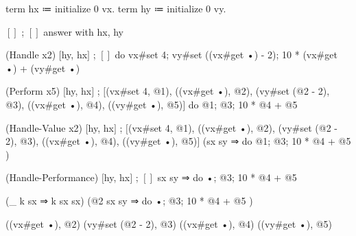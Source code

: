 \begin{snippet}
term hx ≔ initialize 0 vx.
term hy ≔ initialize 0 vy.

$[]$ ; $[]$
answer with hx, hy

(Handle x2)
$[$hy, hx$]$ ; $[]$
do{ vx#set 4; vy#set ((vx#get •) - 2); 10 * (vx#get •) + (vy#get •) }

(Perform x5)
$[$hy, hx$]$ ; $[$(vx#set 4, @1), ((vx#get •), @2), (vy#set (@2 - 2), @3), ((vx#get •), @4), ((vy#get •), @5)$]$
do{ @1; @3; 10 * @4 + @5 }

(Handle-Value x2)
$[$hy, hx$]$ ; $[$(vx#set 4, @1), ((vx#get •), @2), (vy#set (@2 - 2), @3), ((vx#get •), @4), ((vy#get •), @5)$]$
(sx sy ⇒ do{ @1; @3; 10 * @4 + @5 })

(Handle-Performance)
$[$hy, hx$]$ ; $[]$
sx sy ⇒ do{ •; @3; 10 * @4 + @5 }

(_ k sx ⇒ k sx sx)
  (@2 sx sy ⇒ do{ •; @3; 10 * @4 + @5 })

((vx#get •), @2)
(vy#set (@2 - 2), @3)
((vx#get •), @4)
((vy#get •), @5)
\end{snippet}
